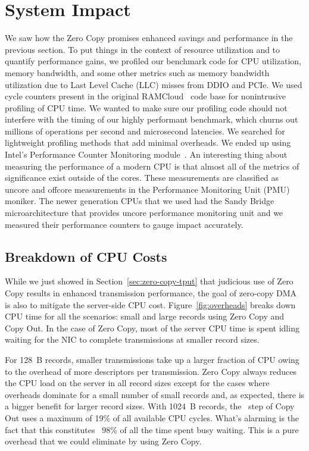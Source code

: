 \section{System Impact}
\label{sec:impact}

We saw how the Zero Copy promises enhanced savings and performance 
in the previous section. To put things in the context of resource utilization and
 to quantify performance gains, we profiled our benchmark code for CPU utilization, memory bandwidth, 
 and some other metrics such as memory bandwidth utilization due to Last Level Cache (LLC) misses from DDIO and PCIe.
We used cycle counters present in the original RAMCloud~\cite{ramcloud} code base for nonintrusive profiling 
of CPU time. We wanted to make sure our profiling code should not interfere with the timing of our highly performant 
 benchmark, which churns out millions of operations per second and microsecond latencies. 
 We searched for lightweight profiling methods that add minimal overheads.
 We ended up using Intel\textregistered's Performance Counter Monitoring module~\cite{intelpcm}. 
 An interesting thing about measuring the performance 
 of a modern CPU is that almost all of the metrics of significance exist outside of the cores. These measurements 
 are classified as uncore and offcore measurements in the Performance Monitoring Unit (PMU) moniker.
 The newer generation CPUs that we used had the Sandy Bridge microarchitecture that provides uncore performance 
 monitoring unit and we measured their performance counters to gauge impact accurately.


\subsection{Breakdown of CPU Costs}
\label{sec:overhead}

While we just showed in Section~\ref{sec:zero-copy-tput} that judicious use of Zero Copy results 
in enhanced transmission performance, the goal of zero-copy DMA is also to 
mitigate the server-side CPU cost. Figure~\ref{fig:overheads} breaks down CPU time for 
all the scenarios: small and large records using Zero Copy and Copy Out. In the case 
of Zero Copy, most of the server CPU time is spent idling waiting for the NIC 
to complete transmissions at smaller record sizes.

 For 128~B records, smaller transmissions take up a larger fraction of CPU owing to the overhead of more descriptors
per transmission. Zero Copy always reduces the CPU load on the server in all record sizes except for the cases where
overheads dominate for a small number of small records and, as expected, there is a bigger
benefit for larger record sizes. With 1024~B records, the \memcpy ~step of Copy Out uses a maximum of 19\% of all available
CPU cycles. What's alarming is the fact that this constitutes ~98\% of all the time spent busy waiting.
This is a pure overhead that we could eliminate by using Zero Copy.

